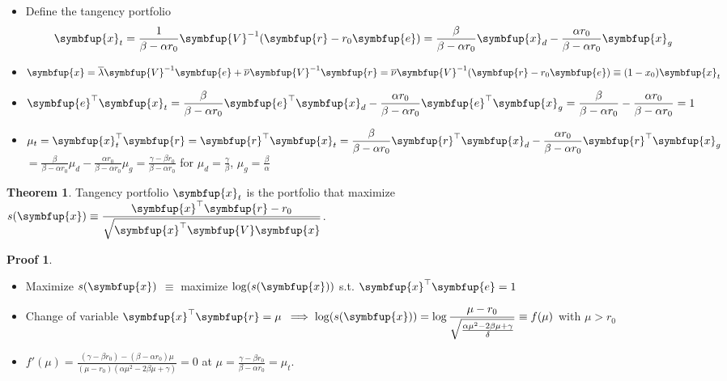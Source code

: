\documentclass[10pt,handout]{beamer}
\newcommand{\ds}{\displaystyle}
\newcommand{\ie}{\;\Longrightarrow\;}
\newcommand{\vx}{\symbfup{x}}
\newcommand{\vV}{\symbfup{V}}
\newcommand{\ve}{\symbfup{e}}
\newcommand{\vr}{\symbfup{r}}
\theoremstyle{definition}
\newtheorem*{thm}{Theorem}
\newtheorem*{prf}{Proof}
\begin{document}
\begin{frame}
  \begin{itemize}[<+->]
    \item Define the tangency portfolio
      \onslide<+->
      \begin{align*}
        \ds\vx_t = \frac{1}{\beta-\alpha r_0}\vV^{-1}(\vr - r_0\ve) = \frac{\beta}{\beta - \alpha r_0}\vx_d - \frac{\alpha r_0}{\beta - \alpha r_0}\vx_g
      \end{align*}
    \item $\ds\vx = \overline{\lambda}\vV^{-1}\ve + \overline{\nu}\vV^{-1}\vr = \overline{\nu}\vV^{-1}(\vr - r_0\ve)\equiv(1 - x_0)\vx_t$
    \item $\ds\ve^\top\vx_t = \frac{\beta}{\beta - \alpha r_0}\ve^\top\vx_d - \frac{\alpha r_0}{\beta - \alpha r_0}\ve^\top\vx_g = \frac{\beta}{\beta - \alpha r_0} - \frac{\alpha r_0}{\beta - \alpha r_0} = 1$
    \item $\ds\mu_t = \vx^\top_t\vr = \vr^\top\vx_t = \frac{\beta}{\beta - \alpha r_0}\vr^\top\vx_d - \frac{\alpha r_0}{\beta - \alpha r_0}\vr^\top\vx_g$ \\$\ds = \frac{\beta}{\beta - \alpha r_0}\mu_d - \frac{\alpha r_0}{\beta - \alpha r_0}\mu_g = \frac{\gamma - \beta r_0}{\beta - \alpha r_0}$ for $\ds\mu_d = \frac{\gamma}{\beta}$, $\ds\mu_g = \frac{\beta}{\alpha}$
  \end{itemize}
\end{frame}

\begin{frame}
  \onslide<+->
  \begin{thm}
    Tangency portfolio $\vx_t$ is the portfolio that maximize $\ds s(\vx)\equiv\frac{\vx^\top\vr - r_0}{\sqrt{\vx^\top\vV\vx}}$.
  \end{thm}
  \begin{prf}
    \begin{itemize}[<+->]
      \item Maximize $s(\vx)$ $\equiv$ maximize $\log(s(\vx))$ s.t. $\ds\vx^\top\ve = 1$ 
      \item Change of variable $\vx^\top\vr = \mu$ $\ds\ie\log(s(\vx)) = \log\frac{\mu - r_0}{\sqrt{\frac{\alpha\mu^2 - 2\beta\mu + \gamma}{\delta}}}\equiv f(\mu)$ with $\mu > r_0$
      \item $\ds f'(\mu) = \frac{(\gamma - \beta r_0) - (\beta - \alpha r_0)\mu}{(\mu - r_0)\left(\alpha\mu^2 - 2\beta\mu + \gamma\right)} = 0$ at $\ds\mu = \frac{\gamma - \beta r_0}{\beta - \alpha r_0} = \mu_t$.
    \end{itemize}
  \end{prf}
\end{frame}
\end{document}

